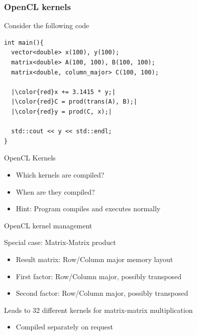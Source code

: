 \begin{frame}[fragile]
\frametitle{OpenCL kernels}

\begin{block}{Consider the following code}
  \begin{lstlisting}
int main(){
  vector<double> x(100), y(100);
  matrix<double> A(100, 100), B(100, 100);
  matrix<double, column_major> C(100, 100);

  |\color{red}x += 3.1415 * y;|
  |\color{red}C = prod(trans(A), B);|
  |\color{red}y = prod(C, x);|

  std::cout << y << std::endl;
}
  \end{lstlisting}
\end{block}

\begin{block}{OpenCL Kernels}
  \begin{itemize}
    \item Which kernels are compiled?
    \item When are they compiled?
    \item Hint: Program compiles and executes normally
  \end{itemize}
\end{block}

\end{frame}


\begin{frame}{OpenCL kernel management}

\begin{block}{Special case: Matrix-Matrix product}
  \begin{itemize}
    \item Result matrix: Row/Column major memory layout
    \item First factor: Row/Column major, possibly transposed
    \item Second factor: Row/Column major, possibly transposed
  \end{itemize}
\end{block}

\begin{block}{Leads to 32 different kernels for matrix-matrix multiplication}
  \begin{itemize}
    \item Compiled separately on request
  \end{itemize}
\end{block}

\end{frame}



